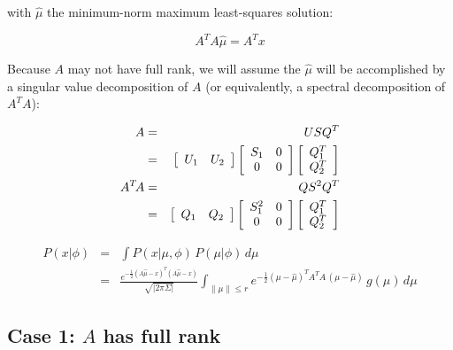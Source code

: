 \documentclass{amsart}
\begin{document}
with $\hat{\mu}$ the minimum-norm maximum least-squares solution:

\begin{equation}
  A^T A \hat{\mu} = A^T x
\end{equation}

Because $A$ may not have full rank, we will assume the $\hat{\mu}$
will be accomplished by a singular value decomposition of $A$ (or
equivalently, a spectral decomposition of $A^T\!A$):

\begin{eqnarray}
  A &=& U S Q^T \\
  &=& 
  \left[\begin{array}{ c c }
      U _1 & U_2
      \end{array}\right]
  \left[\begin{array}{ c c }
      S_1 & 0 \\
      0 & 0
    \end{array}\right]
  \left[\begin{array}{ c }
      Q_1^T \\
      Q_2^T
    \end{array}\right]
  \\
  A^T\!A &=& Q S^2 Q^T \\
  &=& 
  \left[\begin{array}{ c c }
      Q_1 & Q_2
    \end{array}\right]
  \left[\begin{array}{ c c }
      S_1^2 & 0 \\
      0 & 0
    \end{array}\right]
  \left[\begin{array}{ c }
      Q_1^T \\
      Q_2^T
    \end{array}\right]  
\end{eqnarray}

\begin{eqnarray}
  P(x|\phi) &=& \int P(x|\mu,\phi)\,P(\mu|\phi)\,d\mu \\
  &=& 
  \frac{e^{-\frac{1}{2}(A\hat{\mu}-x)^T(A\hat{\mu}-x)}}
       {\sqrt{\left|2\pi\Sigma\right|}}
  \int_{\lVert\mu\rVert \le r} \!\!\!\!\!\!\!\!\!\!\!\!
  e^{-\frac{1}{2}(\mu-\hat{\mu})^T\!A^T\!A\,(\mu-\hat{\mu})}\,g(\mu)\,d\mu
\end{eqnarray}

\subsection{Case 1: $A$ has full rank}
\end{document}
